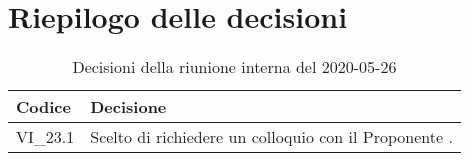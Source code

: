 \section{Riepilogo delle decisioni}
\begin{longtable}{
	 >{\centering}p{} >{}p{} }

	\caption{Decisioni della riunione interna del 2020-05-26}\\

	\textbf{\color{white}Codice} &
	\textbf{\color{white}Decisione}
	\tabularnewline
	\endhead

	VI\_23.1 & Scelto di richiedere un colloquio con il Proponente \Proponente{}. \\
\end{longtable}
